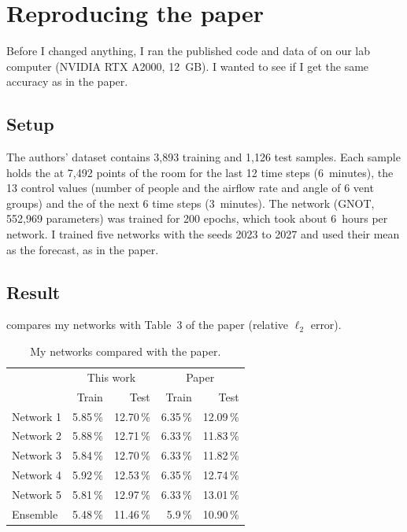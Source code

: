 \chapter{Reproducing the paper}
\label{ch:repro}

Before I changed anything, I ran the published code and data of \citet{bian2025} on our lab computer
(NVIDIA RTX A2000, 12~GB). I wanted to see if I get the same accuracy as in the paper.

\section{Setup}
The authors' dataset contains 3,893 training and 1,126 test samples. Each sample holds the \cotwo{}
at 7,492 points of the room for the last 12 time steps (6~minutes), the 13 control values (number of
people and the airflow rate and angle of 6 vent groups) and the \cotwo{} of the next 6 time steps
(3~minutes). The network (GNOT, 552,969 parameters) was trained for 200 epochs, which took about
6~hours per network. I trained five networks with the seeds 2023 to 2027 and used their mean as
the forecast, as in the paper.

\section{Result}
 compares my networks with Table~3 of the paper (relative $\ell_2$ error).

\begin{table}[h]
  \centering
  \caption{My networks compared with the paper.}
  \label{tab:repro}
  \begin{tabular}{lrrrr}
    \toprule
     & \multicolumn{2}{c}{This work} & \multicolumn{2}{c}{Paper}\\
     & Train & Test & Train & Test\\
    \midrule
    Network 1 & 5.85\,\% & 12.70\,\% & 6.35\,\% & 12.09\,\%\\
    Network 2 & 5.88\,\% & 12.71\,\% & 6.33\,\% & 11.83\,\%\\
    Network 3 & 5.84\,\% & 12.70\,\% & 6.33\,\% & 11.82\,\%\\
    Network 4 & 5.92\,\% & 12.53\,\% & 6.35\,\% & 12.74\,\%\\
    Network 5 & 5.81\,\% & 12.97\,\% & 6.33\,\% & 13.01\,\%\\
    Ensemble  & 5.48\,\% & 11.46\,\% & 5.9\,\%  & 10.90\,\%\\
    \bottomrule
  \end{tabular}
\end{table}

